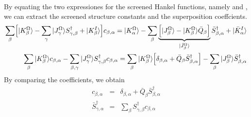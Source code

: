 \documentclass[11pt,a4paper]{report}
\begin{document}
By equating the two expressiones for the screened Hankel functions,
namely  and , we can
extract the screened structure constants and the superposition
coeffcients.
\begin{eqnarray}
\sum_\beta\Bigl[|K^\Omega_{\beta}\rangle
-\sum_{\gamma}|J^\Omega_{\gamma}\rangle S^\dagger_{\gamma,\beta}
+|K^I_{\beta}\rangle \Bigr]c_{\beta,\alpha}
=
|K^\Omega_{\alpha}\rangle
-\sum_{\beta}
\underbrace{\Bigl[|J^\Omega_{\beta}\rangle-|K^\Omega_{\beta}\rangle\bar{Q}_\beta\Bigr]}
_{|\bar{J}^\Omega_{\beta}\rangle} \bar{S}^\dagger_{\beta,\alpha}
+|\bar{K}^I_{\alpha}\rangle
\nonumber\\
\sum_\beta
|K^\Omega_{\beta}\rangle c_{\beta,\alpha}
-\sum_{\beta,\gamma}|J^\Omega_{\gamma}\rangle S^\dagger_{\gamma,\beta} c_{\beta,\alpha}
=
\sum_{\beta}|K^\Omega_{\beta}\rangle
\Bigl[\delta_{\beta,\alpha}+
\bar{Q}_\beta \bar{S}^\dagger_{\beta,\alpha}\Bigr]
-\sum_{\beta}|J^\Omega_{\beta}\rangle \bar{S}^\dagger_{\beta,\alpha}
\end{eqnarray}
By comparing the coefficients, we obtain
\begin{eqnarray}
c_{\beta,\alpha}&=&\delta_{\beta,\alpha}+
\bar{Q}_\beta \bar{S}^\dagger_{\beta,\alpha}
\nonumber\\
\bar{S}^\dagger_{\gamma,\alpha}&=&\sum_\beta S^\dagger_{\gamma,\beta} c_{\beta,\alpha}
\label{eq:definingeqsystemforsbar}
\end{eqnarray}
\end{document}
